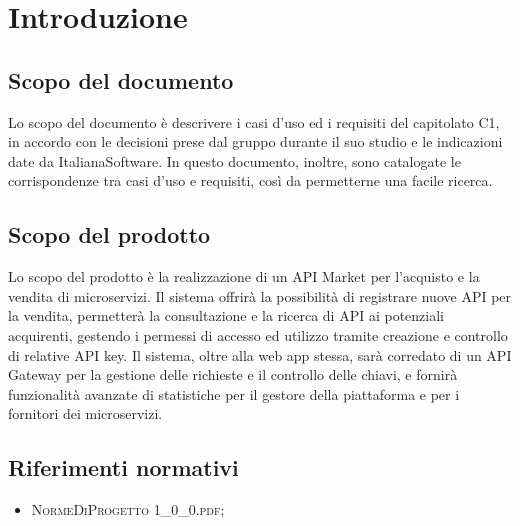 \newpage
\section{Introduzione}

\subsection{Scopo del documento}
Lo scopo del documento è descrivere i casi d'uso ed i requisiti del capitolato C1, in accordo con le decisioni prese dal gruppo durante il suo studio e le indicazioni date da ItalianaSoftware. In questo documento, inoltre, sono catalogate le corrispondenze tra casi d'uso e requisiti, così da permetterne una facile ricerca.

\subsection{Scopo del prodotto}
Lo scopo del prodotto è la realizzazione di un API Market per l'acquisto e la vendita di microservizi. Il sistema offrirà la possibilità di registrare nuove API per la vendita, permetterà la consultazione e la ricerca di API ai potenziali acquirenti, gestendo i permessi di accesso ed utilizzo tramite creazione e controllo di relative API key. Il sistema, oltre alla web app stessa, sarà corredato di un API Gateway per la gestione delle richieste e il controllo delle chiavi, e fornirà funzionalità avanzate di statistiche per il gestore della piattaforma e per i fornitori dei microservizi.

\subsection{Riferimenti normativi}
\begin{itemize}
	\item \textsc{NormeDiProgetto 1\_0\_0.pdf};
\end{itemize}

